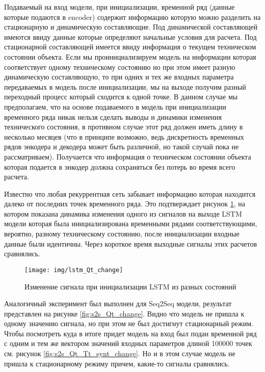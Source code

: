\documentclass[12pt,a4paper]{article}
\begin{document}
Подаваемый на вход модели, при инициализации, временной ряд (данные которые подаются в encoder) содержит информацию которую можно разделить на стационарную и динамическую составляющие. Под динамической составляющей имеются ввиду данные которые определяют начальные условия для расчета. Под стационарной составляющей имеется ввиду информация о текущем техническом состоянии объекта. Если мы проинициализируем модель на информации которая соответствует одному техническому состоянию но при этом имеет разную динамическую составляющую, то при одних и тех же входных параметра передаваемых в модель после инициализации, мы на выходе получим разный переходный процесс который сходится к одной точке. В данном случае мы предполагаем, что на основе подаваемого в модель при инициализации временного ряда никак нельзя сделать выводы и динамики изменения технического состояния, в противном случае этот ряд должен иметь длину в несколько месяцев (что в принципе возможно, ведь дискретность временных рядов энкодера и декодера может быть различной, но такой случай пока не рассматриваем). Получается что информация о техническом состоянии объекта которая подается в энкодер должна сохраняться без потерь во время всего расчета.

Известно что любая рекуррентная сеть забывает информацию которая находится далеко от последних точек временного ряда. Это подтверждает рисунок \ref{fig:lstm_Qt_change}, на котором показана динамика изменения одного из сигналов на выходе LSTM модели которая была инициализирована временными рядами  соответствующими, вероятно, разному техническому состоянию, после инициализации входные данные были идентичны. Через короткое время выходные сигналы этих расчетов сравнялись.

\begin{figure}[htbp]
	\centering\texttt{[image: img/lstm\_Qt\_change]}
	\caption{Изменение сигнала при инициализации LSTM из разных состояний}
	\label{fig:lstm_Qt_change}
\end{figure}

Аналогичный эксперимент был выполнен для Seq2Seq модели, результат представлен на рисунке \ref{fig:s2s_Qt_change}. Видно что модель не пришла к одному значению сигнала, но при этом не был достигнут стационарный режим. Чтобы посмотреть куда в итоге придет модель на вход был подан временной ряд с одним и тем же вектором значений входных параметров длиной 100000 точек см. рисунок \ref{fig:s2s_Qt_Tt_synt_change}. Но и в этом случае модель не пришла к стационарному режиму причем, какие-то сигналы сравнялись.
\end{document}
